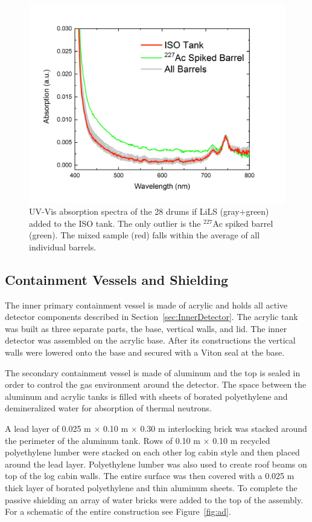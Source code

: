 \begin{figure}[h]
	\centering
	\includegraphics[width=0.6\linewidth]{tex/4-prospect-images/LiLS}
	\caption[LiLS UV-Vis absorption spectra]{UV-Vis absorption spectra of the 28 drums if LiLS (gray+green) added to the ISO tank. The only outlier is the $^{227}$Ac spiked barrel (green). The mixed sample (red) falls within the average of all individual barrels.}
	\label{fig:lils}
\end{figure}


\subsection{Containment Vessels and Shielding}

The inner primary containment vessel is made of acrylic and holds all active detector components described in Section~\ref{sec:InnerDetector}. 
The acrylic tank was built as three separate parts, the base, vertical walls, and lid. 
The inner detector was assembled on the acrylic base. After its constructions the vertical walls were lowered onto the base and secured with a Viton seal at the base. 

The secondary containment vessel is made of aluminum and the top is sealed in order to control the gas environment around the detector.
The space between the aluminum and acrylic tanks is filled with sheets of borated polyethylene and demineralized water for absorption of thermal neutrons.

A lead layer of 0.025 m $\times$ 0.10 m $\times$ 0.30 m interlocking brick was stacked around the perimeter of the aluminum tank. 
Rows of 0.10 m $\times$ 0.10 m recycled polyethylene lumber were stacked on each other log cabin style and then placed around the lead layer.
Polyethylene lumber was also used to create roof beams on top of the log cabin walls.
The entire surface was then covered with a 0.025 m thick layer of borated polyethylene and thin aluminum sheets. 
To complete the passive shielding an array of water bricks were added to the top of the assembly. 
For a schematic of the entire construction see Figure~\ref{fig:ad}.



